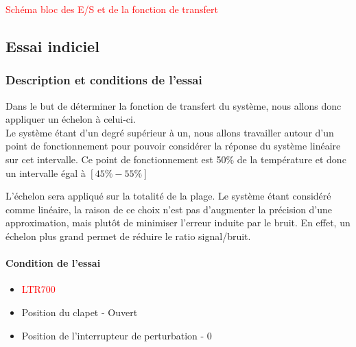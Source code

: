 \textcolor{red}{Schéma bloc des E/S et de la fonction de transfert}

\subsection{Essai indiciel}
\subsubsection{Description et conditions de l'essai}
Dans le but de déterminer la fonction de transfert du système, nous allons donc appliquer un échelon à celui-ci.\\

Le système étant d'un degré supérieur à un, nous allons travailler autour d'un point de fonctionnement pour pouvoir considérer la réponse du système linéaire sur cet intervalle. Ce point de fonctionnement est 50\% de la température et donc un intervalle égal à $[45\% - 55\%]$

L'échelon sera appliqué sur la totalité de la plage. Le système étant considéré comme linéaire, la raison de ce choix n'est pas d'augmenter la précision d'une approximation, mais plutôt de minimiser l'erreur induite par le bruit. En effet, un échelon plus grand permet de réduire le ratio signal/bruit.\\

\paragraph{Condition de l'essai}
\begin{itemize}
\item \textcolor{red}{LTR700}
\item Position du clapet - Ouvert
\item Position de l'interrupteur de perturbation - 0
\end{itemize}

